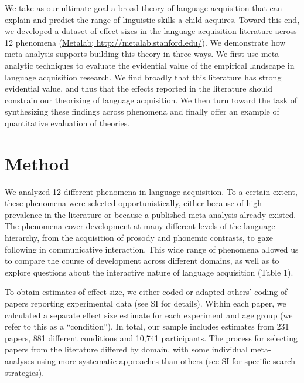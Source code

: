 \documentclass[english,floatsintext,man]{apa6}
\begin{document}
We take as our ultimate goal a broad theory of language acquisition that
can explain and predict the range of linguistic skills a child acquires.
Toward this end, we developed a dataset of effect sizes in the language
acquisition literature across 12 phenomena
(\href{http://metalab.stanford.edu}{Metalab;
http://metalab.stanford.edu/}). We demonstrate how meta-analysis
supports building this theory in three ways. We first use meta-analytic
techniques to evaluate the evidential value of the empirical landscape
in language acquisition research. We find broadly that this literature
has strong evidential value, and thus that the effects reported in the
literature should constrain our theorizing of language acquisition. We
then turn toward the task of synthesizing these findings across
phenomena and finally offer an example of quantitative evaluation of
theories.

\section{Method}\label{method}

We analyzed 12 different phenomena in language acquisition. To a certain
extent, these phenomena were selected opportunistically, either because
of high prevalence in the literature or because a published
meta-analysis already existed. The phenomena cover development at many
different levels of the language hierarchy, from the acquisition of
prosody and phonemic contrasts, to gaze following in communicative
interaction. This wide range of phenomena allowed us to compare the
course of development across different domains, as well as to explore
questions about the interactive nature of language acquisition (Table
1).

To obtain estimates of effect size, we either coded or adapted others'
coding of papers reporting experimental data (see SI for details).
Within each paper, we calculated a separate effect size estimate for
each experiment and age group (we refer to this as a
\enquote{condition}). In total, our sample includes estimates from 231
papers, 881 different conditions and 10,741 participants. The process
for selecting papers from the literature differed by domain, with some
individual meta-analyses using more systematic approaches than others
(see SI for specific search strategies).
\renewcommand{\arraystretch}{1.5}
\end{document}

